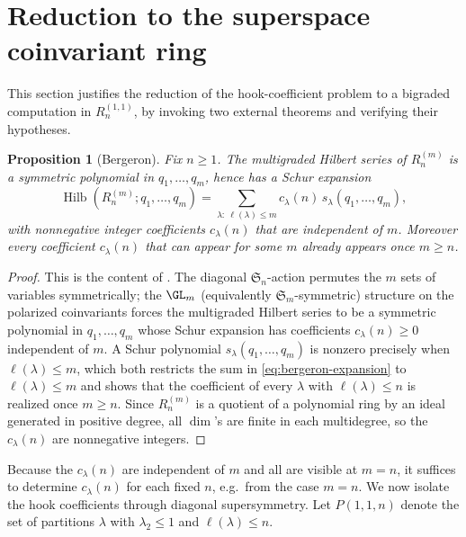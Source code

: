 \documentclass[11pt]{amsart}
\newtheorem{proposition}[theorem]{Proposition}
\theoremstyle{definition}
\DeclareMathOperator{\Hilb}{Hilb}
\begin{document}
\section{Reduction to the superspace coinvariant ring}\label{sec:reduction}

This section justifies the reduction of the hook-coefficient problem to a
bigraded computation in $R_n^{(1,1)}$, by invoking two external theorems and
verifying their hypotheses.

\begin{proposition}[Bergeron]\label{prop:bergeron}
Fix $n\ge1$. The multigraded Hilbert series of $R_n^{(m)}$ is a symmetric
polynomial in $q_1,\dots,q_m$, hence has a Schur expansion
\begin{equation}\label{eq:bergeron-expansion}
\Hilb(R_n^{(m)}; q_1,\ldots,q_m)
= \sum_{\lambda:\ \ell(\lambda)\le m} c_\lambda(n)\, s_\lambda(q_1,\ldots,q_m),
\end{equation}
with nonnegative integer coefficients $c_\lambda(n)$ that are independent of $m$.
Moreover every coefficient $c_\lambda(n)$ that can appear for some $m$ already
appears once $m\ge n$.
\end{proposition}

\begin{proof}
This is the content of \cite{Bergeron2020}. The diagonal $\mathfrak{S}_n$-action
permutes the $m$ sets of variables symmetrically; the $\GL_m$ (equivalently
$\mathfrak{S}_m$-symmetric) structure on the polarized coinvariants forces the
multigraded Hilbert series to be a symmetric polynomial in $q_1,\dots,q_m$ whose
Schur expansion has coefficients $c_\lambda(n)\ge0$ independent of $m$. A Schur
polynomial $s_\lambda(q_1,\dots,q_m)$ is nonzero precisely when
$\ell(\lambda)\le m$, which both restricts the sum in
\eqref{eq:bergeron-expansion} to $\ell(\lambda)\le m$ and shows that the
coefficient of every $\lambda$ with $\ell(\lambda)\le n$ is realized once
$m\ge n$. Since $R_n^{(m)}$ is a quotient of a polynomial ring by an ideal
generated in positive degree, all $\dim$'s are finite in each multidegree, so the
$c_\lambda(n)$ are nonnegative integers.
\end{proof}

Because the $c_\lambda(n)$ are independent of $m$ and all are visible at $m=n$,
it suffices to determine $c_\lambda(n)$ for each fixed $n$, e.g.\ from the case
$m=n$. We now isolate the hook coefficients through diagonal supersymmetry. Let
$P(1,1,n)$ denote the set of partitions $\lambda$ with $\lambda_2\le1$ and
$\ell(\lambda)\le n$.
\end{document}
